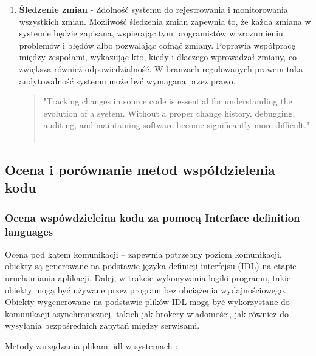 \documentclass[runningheads,12pt]{llncs}
\begin{document}
\begin{enumerate}
    \item \textbf{Śledzenie zmian} - Zdolność systemu do rejestrowania i monitorowania wszystkich zmian. Możliwość śledzenia zmian zapewnia to, że każda zmiana w systemie będzie zapisana, wspierając tym programistów w zrozumieniu problemów i błędów albo pozwalając cofnąć zmiany. Poprawia współpracę między zespołami, wykazując kto, kiedy i dlaczego wprowadzał zmiany, co zwiększa również odpowiedzialność. W branżach regulowanych prawem taka audytowalność systemu może być wymagana przez prawo.
    \begin{quote}
        "Tracking changes in source code is essential for understanding the evolution of a system. Without a proper change history, debugging, auditing, and maintaining software become significantly more difficult." ~\cite[p. 150]{rubin2012essential}
    \end{quote}
\end{enumerate}

\subsection{Ocena i porównanie metod współdzielenia kodu}

\subsubsection{Ocena wspówdzieleina kodu za pomocą Interface definition languages}

Ocena pod kątem komunikacji – zapewnia potrzebny poziom komunikacji, obiekty są generowane na podstawie języka definicji interfejsu (IDL) na etapie uruchamiania aplikacji. Dalej, w trakcie wykonywania logiki programu, takie obiekty mogą być używane przez program bez obciążenia wydajnościowego. Obiekty wygenerowane na podstawie plików IDL mogą być wykorzystane do komunikacji asynchronicznej, takich jak brokery wiadomości, jak również do wysyłania bezpośrednich zapytań między serwisami.

Metody zarządzania plikami idl w systemach : 
\end{document}
